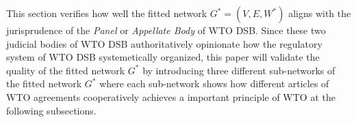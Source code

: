This section verifies
how well the fitted network $G^* = (V, E, W^*)$
aligns with the jurisprudence of the \textit{Panel} or \textit{Appellate Body} of WTO DSB.
Since these two judicial bodies of WTO DSB authoritatively
opinionate how the regulatory system of WTO DSB systemetically organized,
this paper will validate the quality of the fitted network $G^*$ by 
introducing three different sub-networks of 
the fitted network $G^*$ where each sub-network shows how different articles of WTO agreements 
cooperatively achieves a important principle of WTO 
at the following subsections.



